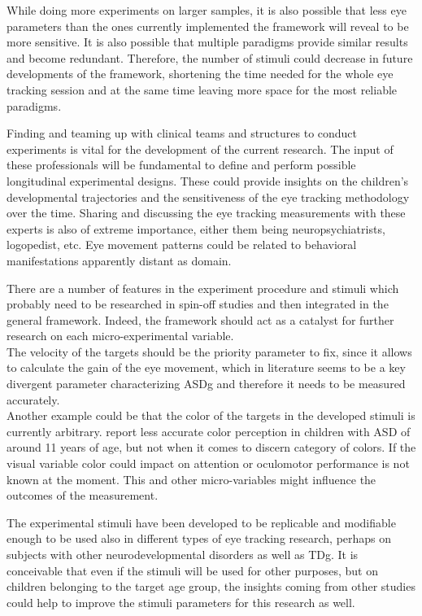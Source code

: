 While doing more experiments on larger samples, it is also possible that less eye parameters than the ones currently implemented the framework will reveal to be more sensitive. It is also possible that multiple paradigms provide similar results and become redundant. Therefore, the number of stimuli could decrease in future developments of the framework, shortening the time needed for the whole eye tracking session and at the same time leaving more space for the most reliable paradigms.

Finding and teaming up with clinical teams and structures to conduct experiments is vital for the development of the current research. The input of these professionals will be fundamental to define and perform possible longitudinal experimental designs. These could provide insights on the children’s developmental trajectories and the sensitiveness of the eye tracking methodology over the time.
Sharing and discussing the eye tracking measurements with these experts is also of extreme importance, either them being neuropsychiatrists, logopedist, etc. Eye movement patterns could be related to behavioral manifestations apparently distant as domain.

There are a number of features in the experiment procedure and stimuli which probably need to be researched in spin-off studies and then integrated in the general framework. Indeed, the framework should act as a catalyst for further research on each micro-experimental variable.\\
The velocity of the targets should be the priority parameter to fix, since it allows to calculate the gain of the eye movement, which in literature seems to be a key divergent parameter characterizing ASDg and therefore it needs to be measured accurately.\\
Another example could be that the color of the targets in the developed stimuli is currently arbitrary. \cite{franklin2008colorASD} report less accurate color perception in children with ASD of around 11 years of age, but not when it comes to discern category of colors. If the visual variable color could impact on attention or oculomotor performance is not known at the moment. This and other micro-variables might influence the outcomes of the measurement.

The experimental stimuli have been developed to be replicable and modifiable enough to be used also in different types of eye tracking research, perhaps on subjects with other neurodevelopmental disorders as well as TDg. It is conceivable that even if the stimuli will be used for other purposes, but on children belonging to the target age group, the insights coming from other studies could help to improve the stimuli parameters for this research as well.

